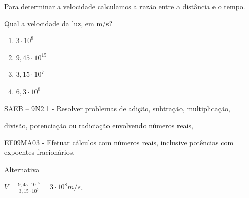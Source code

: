 \begin{escolha}
\begin{boxmedio}
\begin{boxmedio}
{\begin{boxpeq}
\begin{boxpeq}
{\begin{boxpeq}
\begin{boxmedio}
\begin{boxmedio}
\begin{boxpeq}
\begin{boxmedio}
\begin{boxpeq}
\begin{boxpeq}
\begin{boxpeq}
\begin{boxpeq}
\begin{boxmedio}
{\begin{boxmedio}
\begin{boxmedio}
\begin{boxpeq}
\begin{boxmedio}
\begin{boxpeq}
\begin{boxpeq}
\begin{boxpeq}
\begin{escolha}
{\begin{boxmedio}
\begin{boxpeq}
\begin{boxpeq}
\begin{boxpeq}
\begin{boxpeq}
\begin{boxpeq}
\begin{boxmedio}
\begin{boxpeq}
\begin{boxpeq}
\begin{boxpeq}
{\begin{boxpeq}
\begin{boxmedio}
\begin{boxpeq}
\begin{boxpeq}
\begin{boxpeq}
{\begin{boxpeq}
\begin{boxmedio}
{\begin{boxpeq}
\begin{boxpeq}
\begin{boxmedio}
\begin{boxmedio}
\begin{boxpeq}
\begin{boxpeq}
{\begin{boxpeq}
\begin{boxpeq}
\begin{boxpeq}
\begin{boxpeq}
\begin{boxpeq}
\begin{escolha}
\begin{escolha}
{\begin{boxmedio}
\begin{boxpeq}
\begin{q°}
\begin{boxmedio}
\begin{boxpeq}
\begin{boxpeq}
\begin{boxmedio}
\begin{boxmedio}
\begin{boxmedio}
\begin{boxmedio}
{\begin{escolha}
\begin{escolha}
\begin{escolha}
\begin{escolha}
\begin{escolha}
\begin{escolha}
{Para determinar a velocidade calculamos a razão entre a distância e o
tempo.

Qual a velocidade da luz, em m/s?

\begin{enumerate}

\item
  $3 \cdot 10^{8}$
\item
  $9,45 \cdot 10^{15}$
\item
  $3,15 \cdot 10^{7}$
\item
  $6,3 \cdot 10^{8}$
\end{enumerate}

SAEB -- 9N2.1 - Resolver problemas de adição, subtração, multiplicação,

divisão, potenciação ou radiciação envolvendo números reais,

EF09MA03 - Efetuar cálculos com números reais, inclusive potências com
expoentes fracionários.

Alternativa

$V = \frac{9,45 \cdot 10^{15}}{3,15 \cdot 10^{7}} = 3 \cdot 10^{8}m/s$\emph{.}

}
\end{escolha}
\end{escolha}
\end{escolha}
\end{escolha}
\end{escolha}
\end{escolha}}
\end{boxmedio}
\end{boxmedio}
\end{boxmedio}
\end{boxmedio}
\end{boxpeq}
\end{boxpeq}
\end{boxmedio}
\end{q°}
\end{boxpeq}
\end{boxmedio}}
\end{escolha}
\end{escolha}
\end{boxpeq}
\end{boxpeq}
\end{boxpeq}
\end{boxpeq}
\end{boxpeq}}
\end{boxpeq}
\end{boxpeq}
\end{boxmedio}
\end{boxmedio}
\end{boxpeq}
\end{boxpeq}}
\end{boxmedio}
\end{boxpeq}}
\end{boxpeq}
\end{boxpeq}
\end{boxpeq}
\end{boxmedio}
\end{boxpeq}}
\end{boxpeq}
\end{boxpeq}
\end{boxpeq}
\end{boxmedio}
\end{boxpeq}
\end{boxpeq}
\end{boxpeq}
\end{boxpeq}
\end{boxpeq}
\end{boxmedio}}
\end{escolha}
\end{boxpeq}
\end{boxpeq}
\end{boxpeq}
\end{boxmedio}
\end{boxpeq}
\end{boxmedio}
\end{boxmedio}}
\end{boxmedio}
\end{boxpeq}
\end{boxpeq}
\end{boxpeq}
\end{boxpeq}
\end{boxmedio}
\end{boxpeq}
\end{boxmedio}
\end{boxmedio}
\end{boxpeq}}
\end{boxpeq}
\end{boxpeq}}
\end{boxmedio}
\end{boxmedio}
\end{escolha}
